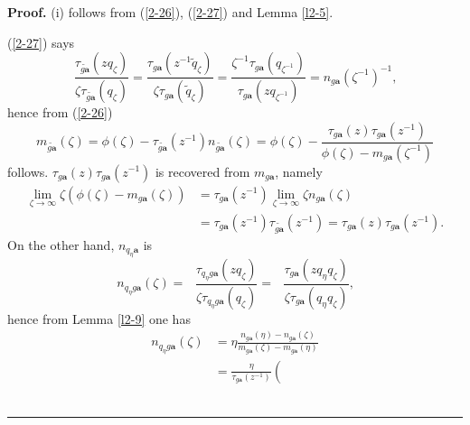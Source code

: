 \documentclass[a4paper]{article}%
\newenvironment{proof}[1][Proof]{\noindent\textbf{#1.} }{\ \rule{0.5em}{0.5em}}
\begin{document}
\begin{proof}
(i) follows from (\ref{2-26}), (\ref{2-27}) and Lemma \ref{l2-5}.

(\ref{2-27}) says%
\[
\dfrac{\tau_{\widetilde{g\boldsymbol{a}}}\left(  zq_{\zeta}\right)  }%
{\zeta\tau_{\widetilde{g\boldsymbol{a}}}\left(  q_{\zeta}\right)  }%
=\dfrac{\tau_{g\boldsymbol{a}}\left(  z^{-1}\widetilde{q}_{\zeta}\right)
}{\zeta\tau_{g\boldsymbol{a}}\left(  \widetilde{q}_{\zeta}\right)  }%
=\dfrac{\zeta^{-1}\tau_{g\boldsymbol{a}}\left(  q_{\zeta^{-1}}\right)  }%
{\tau_{g\boldsymbol{a}}\left(  zq_{\zeta^{-1}}\right)  }=n_{g\boldsymbol{a}%
}\left(  \zeta^{-1}\right)  ^{-1}\text{,}%
\]
hence from (\ref{2-26})%
\[
m_{\widetilde{g\boldsymbol{a}}}\left(  \zeta\right)  =\phi\left(
\zeta\right)  -\tau_{\widetilde{g\boldsymbol{a}}}\left(  z^{-1}\right)
n_{\widetilde{g\boldsymbol{a}}}\left(  \zeta\right)  =\phi\left(
\zeta\right)  -\frac{\tau_{g\boldsymbol{a}}\left(  z\right)  \tau
_{g\boldsymbol{a}}\left(  z^{-1}\right)  }{\phi\left(  \zeta\right)
-m_{g\boldsymbol{a}}\left(  \zeta^{-1}\right)  }%
\]
follows. $\tau_{g\boldsymbol{a}}\left(  z\right)  \tau_{g\boldsymbol{a}%
}\left(  z^{-1}\right)  $ is recovered from $m_{g\boldsymbol{a}}$, namely%
\begin{align*}
\lim_{\zeta\rightarrow\infty}\zeta\left(  \phi\left(  \zeta\right)
-m_{g\boldsymbol{a}}(\zeta)\right)   &  =\tau_{g\boldsymbol{a}}\left(
z^{-1}\right)  \lim_{\zeta\rightarrow\infty}\zeta n_{g\boldsymbol{a}}\left(
\zeta\right) \\
&  =\tau_{g\boldsymbol{a}}\left(  z^{-1}\right)  \tau_{\widetilde
{g\boldsymbol{a}}}\left(  z^{-1}\right)  =\tau_{g\boldsymbol{a}}\left(
z\right)  \tau_{g\boldsymbol{a}}\left(  z^{-1}\right)  \text{.}%
\end{align*}
On the other hand, $n_{q_{\eta}\boldsymbol{a}}$ is%
\[
n_{q_{\eta}g\boldsymbol{a}}\left(  \zeta\right)  =\text{ }\dfrac{\tau
_{q_{\eta}g\boldsymbol{a}}\left(  zq_{\zeta}\right)  }{\zeta\tau_{q_{\eta
}g\boldsymbol{a}}\left(  q_{\zeta}\right)  }=\text{ }\dfrac{\tau
_{g\boldsymbol{a}}\left(  zq_{\eta}q_{\zeta}\right)  }{\zeta\tau
_{g\boldsymbol{a}}\left(  q_{\eta}q_{\zeta}\right)  }\text{,}%
\]
hence from Lemma \ref{l2-9} one has%
\begin{align*}
n_{q_{\eta}g\boldsymbol{a}}\left(  \zeta\right)   &  =\eta\frac
{n_{g\boldsymbol{a}}\left(  \eta\right)  -n_{g\boldsymbol{a}}\left(
\zeta\right)  }{m_{g\boldsymbol{a}}\left(  \zeta\right)  -m_{g\boldsymbol{a}%
}\left(  \eta\right)  }\\
&  =\frac{\eta}{\tau_{g\boldsymbol{a}}\left(  z^{-1}\right)  }\left(

\end{align*}
\end{proof}
\end{document}
